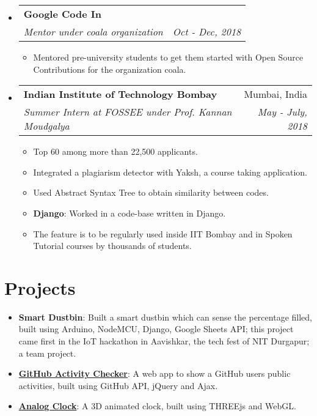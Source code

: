 \documentclass[a4paper,11pt]{article}
\makeatletter
\newcommand{\resumeItem}[2]{
  \item\small{
    \textbf{#1}{: #2 \vspace{-2pt}}
  }
}
\newcommand{\resumeSubheading}[4]{
  \vspace{-1pt}\item
    \begin{tabular*}{0.97\textwidth}[t]{l@{\extracolsep{\fill}}r}
      \textbf{#1 } & #2 \\
      \textit{\small#3} & \textit{\small #4} \\
    \end{tabular*}\vspace{-5pt}
}
\newcommand{\resumeSubHeadingListStart}{\begin{itemize}[leftmargin=*, topsep=0pt]}
\newcommand{\resumeSubHeadingListEnd}{\end{itemize}}
\newcommand{\resumeItemListStart}{\begin{itemize}}
\newcommand{\resumeItemListEnd}{\end{itemize}\vspace{-5pt}}
\makeatother
\begin{document}
    \resumeSubHeadingListStart
      \resumeSubheading
        {Google Code In}{}
        {Mentor under coala organization}{Oct - Dec, 2018}
        \resumeItemListStart
          \item\small
          {Mentored pre-university students to get them started with Open Source Contributions for the organization coala.}
        \resumeItemListEnd
    \resumeSubHeadingListEnd

  \resumeSubHeadingListStart
    \resumeSubheading
    {Indian Institute of Technology Bombay}{Mumbai, India}
    {Summer Intern at FOSSEE under Prof. Kannan Moudgalya}{May - July, 2018}
    \resumeItemListStart
      \item\small
        {Top 60 among more than 22,500 applicants.}
      \item\small
        {Integrated a plagiarism detector with Yaksh, a course taking application.}
      \item\small
        {Used Abstract Syntax Tree to obtain similarity between codes.}
      \resumeItem{Django}
        {Worked in a code-base written in Django.}
      \item\small
        {The feature is to be regularly used inside IIT Bombay and in Spoken Tutorial courses by thousands of students.}
    \resumeItemListEnd
  \resumeSubHeadingListEnd
  
\section{Projects}
      \setlength{\itemsep}{0.5pt}
      \begin{itemize}
        \item\textbf{Smart Dustbin}{: Built a smart dustbin which can sense the percentage filled, built using Arduino, NodeMCU, Django, Google Sheets API; this project came first in the IoT hackathon in Aavishkar, the tech
        fest of NIT Durgapur; a team project.}
        \item\textbf{\href{https://github.com/ayan-b/GitHub-Activity-Checker}{GitHub Activity Checker}}{: A web app to show a GitHub user\textsc{}s public activities, built using GitHub API, jQuery and Ajax.}
        \item\textbf{\href{https://github.com/ayan-b/Analog-Clock-Reading}{Analog Clock}}{: A 3D animated clock, built using THREEjs and WebGL.}
      \end{itemize}
  
\end{document}
